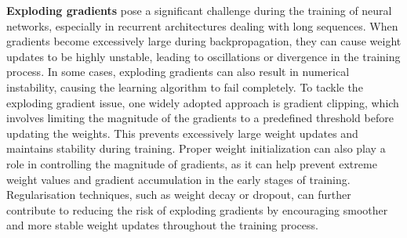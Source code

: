 \textbf{Exploding gradients} pose a significant challenge during the training of neural networks, especially in recurrent architectures dealing with long sequences. When gradients become excessively large during backpropagation, they can cause weight updates to be highly unstable, leading to oscillations or divergence in the training process. In some cases, exploding gradients can also result in numerical instability, causing the learning algorithm to fail completely. To tackle the exploding gradient issue, one widely adopted approach is gradient clipping, which involves limiting the magnitude of the gradients to a predefined threshold before updating the weights. This prevents excessively large weight updates and maintains stability during training. Proper weight initialization can also play a role in controlling the magnitude of gradients, as it can help prevent extreme weight values and gradient accumulation in the early stages of training. Regularisation techniques, such as weight decay or dropout, can further contribute to reducing the risk of exploding gradients by encouraging smoother and more stable weight updates throughout the training process.

